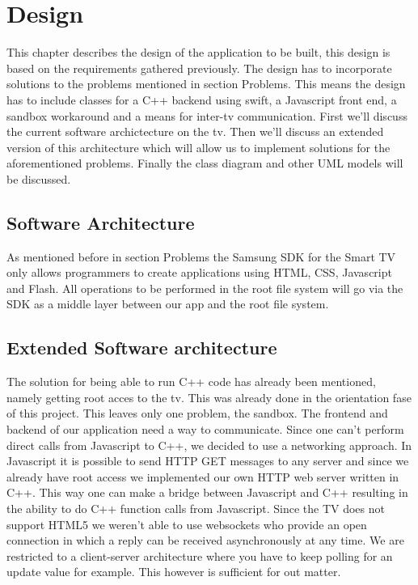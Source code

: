 \chapter{Design}
This chapter describes the design of the application to be built, this design is based on the requirements gathered previously. The design has to incorporate solutions to the problems mentioned in section Problems. %
This means the design has to include classes for a C++ backend using swift, a Javascript front end, a sandbox workaround and a means for inter-tv communication. First we'll discuss the current software archictecture on the tv. Then we'll discuss an extended version of this architecture which will allow us to implement solutions for the aforementioned problems. Finally the class diagram and other UML models will be discussed.

\section{Software Architecture}
As mentioned before in section Problems %
the Samsung SDK for the Smart TV only allows programmers to create applications using HTML, CSS, Javascript and Flash.
All operations to be performed in the root file system will go via the SDK as a middle layer between our app and the root file system.

\section{Extended Software architecture}
The solution for being able to run C++ code has already been mentioned, namely getting root acces to the tv. This was already done in the orientation fase of this project. This leaves only one problem, the sandbox. The frontend and backend of our application need a way to communicate. Since one can't perform direct calls from Javascript to C++, we decided to use a networking approach. In Javascript it is possible to send HTTP GET messages to any server and since we already have root access we implemented our own HTTP web server written in C++. This way one can make a bridge between Javascript and C++ resulting in the ability to do C++ function calls from Javascript. Since the TV does not support HTML5 we weren't able to use websockets who provide an open connection in which a reply can be received asynchronously at any time. We are restricted to a client-server architecture where you have to keep polling for an update value for example. This however is sufficient for out matter. %


